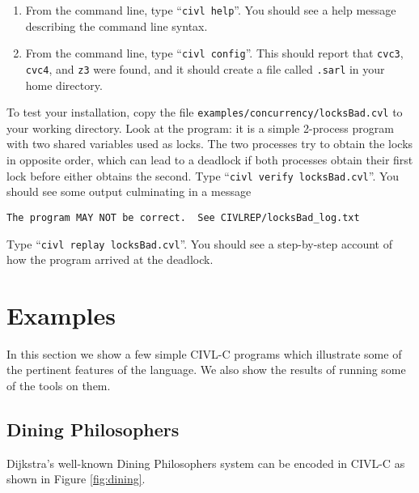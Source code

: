 \begin{enumerate}
\item From the command line, type ``\texttt{civl help}''.  You should see
  a help message describing the command line syntax.

\item From the command line, type ``\texttt{civl config}''.  This should
  report that \texttt{cvc3}, \texttt{cvc4}, and \texttt{z3} were
  found, and it should create a file called \texttt{.sarl} in your
  home directory.

\end{enumerate}

To test your installation, copy the file
\texttt{examples/concurrency/locksBad.cvl} to your working directory.
Look at the program: it is a simple 2-process program with two shared
variables used as locks.  The two processes try to obtain the locks in
opposite order, which can lead to a deadlock if both processes obtain
their first lock before either obtains the second.  Type
``\verb!civl verify locksBad.cvl!''.  You should see some output
culminating in a message
\begin{verbatim}
The program MAY NOT be correct.  See CIVLREP/locksBad_log.txt
\end{verbatim}

Type ``\verb!civl replay locksBad.cvl!''.  You should see a
step-by-step account of how the program arrived at the deadlock.


\chapter{Examples}

In this section we show a few simple CIVL-C programs which illustrate
some of the pertinent features of the language. We also show the results
of running some of the tools on them.

\section{Dining Philosophers}

Dijkstra's well-known Dining Philosophers system can be encoded in
CIVL-C as shown in Figure \ref{fig:dining}.


